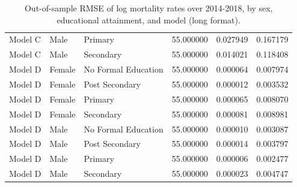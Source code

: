 \begin{table}[ht]
\begin{tabular}{lllrrr}
Model C & Male & Primary & 55.000000 & 0.027949 & 0.167179 \\
Model C & Male & Secondary & 55.000000 & 0.014021 & 0.118408 \\
Model D & Female & No Formal Education & 55.000000 & 0.000064 & 0.007974 \\
Model D & Female & Post Secondary & 55.000000 & 0.000012 & 0.003532 \\
Model D & Female & Primary & 55.000000 & 0.000065 & 0.008070 \\
Model D & Female & Secondary & 55.000000 & 0.000081 & 0.008981 \\
Model D & Male & No Formal Education & 55.000000 & 0.000010 & 0.003087 \\
Model D & Male & Post Secondary & 55.000000 & 0.000014 & 0.003797 \\
Model D & Male & Primary & 55.000000 & 0.000006 & 0.002477 \\
Model D & Male & Secondary & 55.000000 & 0.000023 & 0.004747 \\
\hline
\end{tabular}
\caption{Out-of-sample RMSE of log mortality rates over 2014-2018, by sex, educational attainment, and model (long format).}
\label{tab:revised_table_e1_long}
\end{table}
